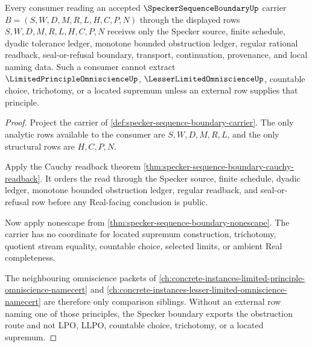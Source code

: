 \begin{theorem}\label{thm:specker-sequence-boundary-lpo-separation}
Every consumer reading an accepted $\SpeckerSequenceBoundaryUp$ carrier $B=(S,W,D,M,R,L,H,C,P,N)$ through the displayed rows $S,W,D,M,R,L,H,C,P,N$ receives only the Specker source, finite schedule, dyadic tolerance ledger, monotone bounded obstruction ledger, regular rational readback, seal-or-refusal boundary, transport, continuation, provenance, and local naming data. Such a consumer cannot extract $\LimitedPrincipleOmniscienceUp$, $\LesserLimitedOmniscienceUp$, countable choice, trichotomy, or a located supremum unless an external row supplies that principle.
\end{theorem}
\begin{proof}
Project the carrier of \autoref{def:specker-sequence-boundary-carrier}. The only analytic rows available to the consumer are $S,W,D,M,R,L$, and the only structural rows are $H,C,P,N$.

Apply the Cauchy readback theorem \autoref{thm:specker-sequence-boundary-cauchy-readback}. It orders the read through the Specker source, finite schedule, dyadic ledger, monotone bounded obstruction ledger, regular readback, and seal-or-refusal row before any Real-facing conclusion is public.

Now apply nonescape from \autoref{thm:specker-sequence-boundary-nonescape}. The carrier has no coordinate for located supremum construction, trichotomy, quotient stream equality, countable choice, selected limits, or ambient Real completeness.

The neighbouring omniscience packets of \autoref{ch:concrete-instances-limited-principle-omniscience-namecert} and \autoref{ch:concrete-instances-lesser-limited-omniscience-namecert} are therefore only comparison siblings. Without an external row naming one of those principles, the Specker boundary exports the obstruction route and not LPO, LLPO, countable choice, trichotomy, or a located supremum.
\end{proof}



